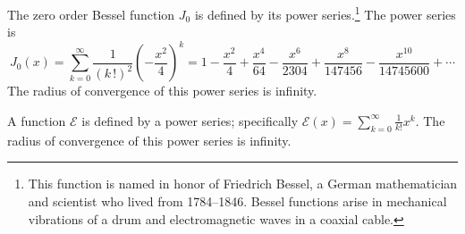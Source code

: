 \documentclass[12pt,fleqn]{exam}
\begin{document}
\begin{questions} 

\question The zero order Bessel function $J_0$ is defined by its power series.\footnote{This function is named in honor of Friedrich Bessel, a German 
 mathematician and scientist  who lived from 1784--1846. Bessel functions arise in  mechanical vibrations of a drum and electromagnetic
 waves in a coaxial cable. }
 The power series is
\begin{equation*}
   J_0(x) = \sum_{k=0}^\infty  \frac{1}{(k \, !)^2}   \left(- \frac{x^2}{4} \right)^k 
               = 1 - \frac{x^2}{4} + \frac{x^4}{64} - \frac{x^6}{2304} +  \frac{x^8}{147456}  - \frac{{{x}^{10}}}{14745600} + \cdots     
 \end{equation*}
The radius  of convergence of this power series is infinity. 


\newpage

\question A function $\mathcal{E}$ is defined by a power series; specifically $\displaystyle \mathcal{E}(x) = \sum_{k=0}^\infty \frac{1}{k!} x^k$.
The radius of convergence of this power series is infinity.


\begin{parts}


\end{parts}
\end{questions}
\end{document}
